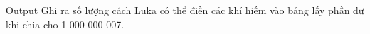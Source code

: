 Output
Ghi ra số lượng cách Luka có thể điền các khí hiếm vào bảng lấy phần dư khi chia cho 1 000 000 007.
